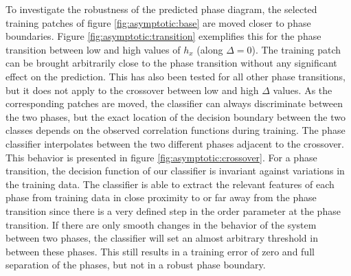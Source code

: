 \documentclass[prl, reprint, twocolumn]{revtex4-1}
\begin{document}
	To investigate the robustness of the predicted phase diagram, the selected training patches of figure \ref{fig:asymptotic:base} are moved closer to phase boundaries. Figure \ref{fig:asymptotic:transition} exemplifies this for the phase transition between low and high values of $h_x$ (along $\Delta=0$). The training patch can be brought arbitrarily close to the phase transition without any significant effect on the prediction. This has also been tested for all other phase transitions, but it does not apply to the crossover between low and high $\Delta$ values. As the corresponding patches are moved, the classifier can always discriminate between the two phases, but the exact location of the decision boundary between the two classes depends on the observed correlation functions during training. The phase classifier interpolates between the two different phases adjacent to the crossover. This behavior is presented in figure \ref{fig:asymptotic:crossover}. For a phase transition, the decision function of our classifier is invariant against variations in the training data. The classifier is able to extract the relevant features of each phase from training data in close proximity to or far away from the phase transition since there is a very defined step in the order parameter at the phase transition. If there are only smooth changes in the behavior of the system between two phases, the classifier will set an almost arbitrary threshold in between these phases. This still results in a training error of zero and full separation of the phases, but not in a robust phase boundary.
	
\end{document}
